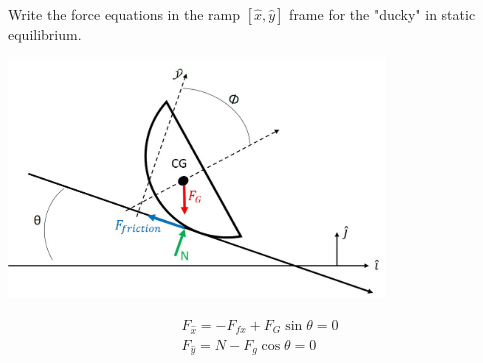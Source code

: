 Write the force equations in the ramp $\left[\hat{x}, \hat{y}\right]$ frame for the "ducky" in static equilibrium.

\begin{center}
    \includegraphics[width=0.75\textwidth]{img/ducky_fbd.png}
\end{center}

\begin{solution}
\begin{align*}
    F_{\hat{x}} = -F_{fx} + F_G\sin\theta = 0 \\
    F_{\hat{y}} = N - F_g\cos\theta = 0
\end{align*}
\end{solution}